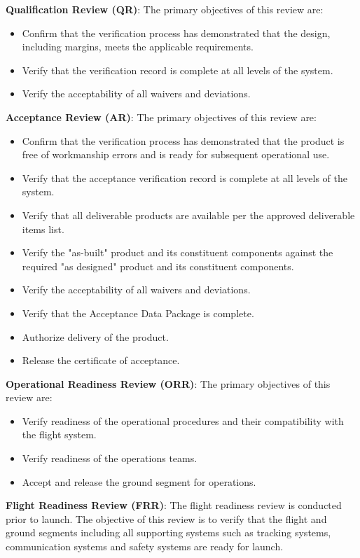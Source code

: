 \textbf{Qualification Review (QR)}: The primary objectives of this review are:
\begin{itemize}
\item Confirm that the verification process has demonstrated that the design, including margins, meets the applicable requirements.
\item Verify that the verification record is complete at all levels of the system.
\item Verify the acceptability of all waivers and deviations. 
\end{itemize}

\textbf{Acceptance Review (AR)}: The primary objectives of this review are:
\begin{itemize}
\item Confirm that the verification process has demonstrated that the product is free of workmanship errors and is ready for subsequent operational use.
\item Verify that the acceptance verification record is complete at all levels of the system.
\item Verify that all deliverable products are available per the approved deliverable items list.
\item Verify the "as-built" product and its constituent components against the required "as designed" product and its constituent components.
\item Verify the acceptability of all waivers and deviations.
\item Verify that the Acceptance Data Package is complete.
\item Authorize delivery of the product.
\item Release the certificate of acceptance.
\end{itemize}

\textbf{Operational Readiness Review (ORR)}: The primary objectives of this review are:
\begin{itemize}
\item Verify readiness of the operational procedures and their compatibility with the flight system.
\item Verify readiness of the operations teams.
\item Accept and release the ground segment for operations.
\end{itemize}

\textbf{Flight Readiness Review (FRR)}: The flight readiness review is conducted prior to launch. The objective of this review is to verify that the flight and ground segments including all supporting systems such as tracking systems, communication systems and safety systems are ready for launch.

